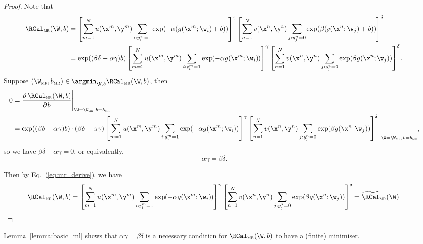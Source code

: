 \begin{proof}
Note that 
\begin{equation}
\label{eq:mr_derive}
\begin{aligned}
\RCal_\textsc{mr}(\W, b) 
&= \left[ \sum_{m=1}^N u(\x^m, \y^m) \sum_{i: y_i^m = 1} \exp(-\alpha (g(\x^m; \w_i) + b)) \right]^\gamma 
   \left[ \sum_{n=1}^N v(\x^n, \y^n) \sum_{j: y_j^n = 0} \exp( \beta  (g(\x^n; \w_j) + b)) \right]^\delta \\
&= \exp( (\beta \delta - \alpha \gamma) b) 
   \left[ \sum_{m=1}^N u(\x^m, \y^m) \sum_{i: y_i^m = 1} \exp(-\alpha g(\x^m; \w_i)) \right]^\gamma 
   \left[ \sum_{n=1}^N v(\x^n, \y^n) \sum_{j: y_j^n = 0} \exp( \beta  g(\x^n; \w_j)) \right]^\delta.
\end{aligned}
\end{equation}
Suppose $(\W_\textsc{mr}, b_\textsc{mr}) \in \argmin_{\W, b} \RCal_\textsc{mr}(\W, b)$, then
\begin{equation*}
\begin{aligned}
0 
&= \frac{\partial \, \RCal_\textsc{mr}(\W, b)} {\partial \, b} \Bigg|_{\W = \W_\textsc{mr}, \, b = b_\textsc{mr}} \\
&= \exp((\beta \delta - \alpha \gamma) b) \cdot (\beta \delta - \alpha \gamma) 
   \left[ \sum_{m=1}^N u(\x^m, \y^m) \sum_{i: y_i^m = 1} \exp(-\alpha g(\x^m; \w_i)) \right]^\gamma  
   \left[ \sum_{n=1}^N v(\x^n, \y^n) \sum_{j: y_j^n = 0} \exp( \beta  g(\x^n; \w_j)) \right]^\delta
   \Bigg|_{\W = \W_\textsc{mr}, \, b = b_\textsc{mr}},
\end{aligned}
\end{equation*}
so we have $\beta \delta - \alpha \gamma = 0$, or equivalently,
\begin{equation*}
\alpha \gamma = \beta \delta.
\end{equation*}

Then by Eq.~(\ref{eq:mr_derive}), we have
\begin{equation*}
\begin{aligned}
\RCal_\textsc{mr}(\W, b) 
= \left[ \sum_{m=1}^N u(\x^m, \y^m) \sum_{i: y_i^m = 1} \exp(-\alpha g(\x^m; \w_i)) \right]^\gamma  
  \left[ \sum_{n=1}^N v(\x^n, \y^n) \sum_{j: y_j^n = 0} \exp( \beta  g(\x^n; \w_j)) \right]^\delta
= \widetilde\RCal_\textsc{mr}(\W).
\end{aligned}
\end{equation*}
\end{proof}

Lemma~\ref{lemma:basic_ml} shows that $\alpha \gamma = \beta \delta$ 
is a necessary condition for $\RCal_\textsc{mr}(\W,b)$ to have a (finite) minimiser.


